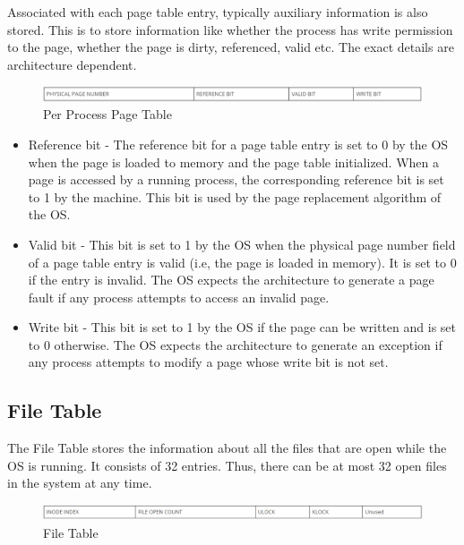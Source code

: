 Associated with each page table entry, typically auxiliary information is also stored. This is to store information like whether the process has write permission to the page, whether the page is dirty, referenced, valid etc. The exact details are architecture dependent.

\begin{figure}[ht]
\centering
\includegraphics  [scale=0.55]{figures/pgt.png}
\caption{\footnotesize Per Process Page Table}
\end{figure}

\begin {itemize}
\item Reference bit - The reference bit for a page table entry is set to 0 by the OS when the page is loaded to memory and the page table initialized. When a page is accessed by a running process, the corresponding reference bit is set to 1 by the machine. This bit is used by the page replacement algorithm of the OS.
\item Valid bit - This bit is set to 1 by the OS when the physical page number field of a page table entry is valid (i.e, the page is loaded in memory). It is set to 0 if the entry is invalid. The OS expects the architecture to generate a page fault if any process attempts to access an invalid page.
\item Write bit - This bit is set to 1 by the OS if the page can be written and is set to 0 otherwise. The OS expects the architecture to generate an exception if any process attempts to modify a page whose write bit is not set.
\end {itemize}

\subsection {File Table}
The File Table stores the information about all the files that are open while the OS is running. It consists of 32 entries. Thus, there can be at most 32 open files in the system at any time.
\begin{figure}[ht]
\centering
\includegraphics  [scale=0.55]{figures/ft.png}
\caption{\footnotesize File Table}
\end{figure}

